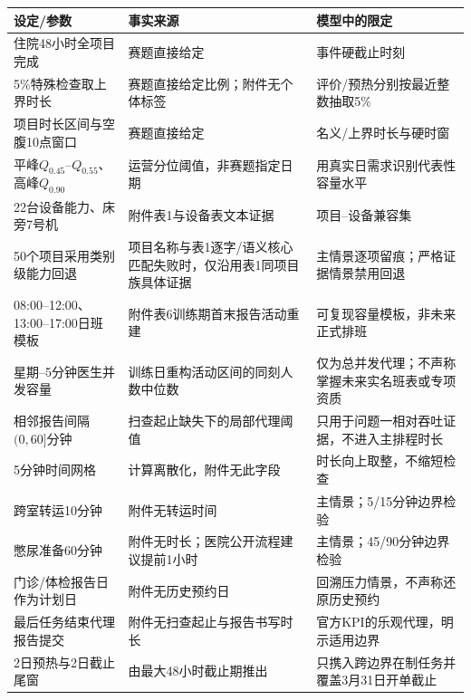 \begin{tabularx}{\textwidth}{p{} p{} X}
\toprule
设定/参数 & 事实来源 & 模型中的限定 \\
\midrule
住院48小时全项目完成 & 赛题直接给定 & 事件硬截止时刻 \\
5\%特殊检查取上界时长 & 赛题直接给定比例；附件无个体标签 & 评价/预热分别按最近整数抽取5\% \\
项目时长区间与空腹10点窗口 & 赛题直接给定 & 名义/上界时长与硬时窗 \\
平峰$Q_{0.45}$--$Q_{0.55}$、高峰$Q_{0.90}$ & 运营分位阈值，非赛题指定日期 & 用真实日需求识别代表性容量水平 \\
22台设备能力、床旁7号机 & 附件表1与设备表文本证据 & 项目--设备兼容集 \\
50个项目采用类别级能力回退 & 项目名称与表1逐字/语义核心匹配失败时，仅沿用表1同项目族具体证据 & 主情景逐项留痕；严格证据情景禁用回退 \\
08:00--12:00、13:00--17:00日班模板 & 附件表6训练期首末报告活动重建 & 可复现容量模板，非未来正式排班 \\
星期--5分钟医生并发容量 & 训练日重构活动区间的同刻人数中位数 & 仅为总并发代理；不声称掌握未来实名班表或专项资质 \\
相邻报告间隔$(0,60]$分钟 & 扫查起止缺失下的局部代理阈值 & 只用于问题一相对吞吐证据，不进入主排程时长 \\
5分钟时间网格 & 计算离散化，附件无此字段 & 时长向上取整，不缩短检查 \\
跨室转运10分钟 & 附件无转运时间 & 主情景；5/15分钟边界检验 \\
憋尿准备60分钟 & 附件无时长；医院公开流程建议提前1小时\cite{hrhospital2025} & 主情景；45/90分钟边界检验 \\
门诊/体检报告日作为计划日 & 附件无历史预约日 & 回溯压力情景，不声称还原历史预约 \\
最后任务结束代理报告提交 & 附件无扫查起止与报告书写时长 & 官方KPI的乐观代理，明示适用边界 \\
2日预热与2日截止尾窗 & 由最大48小时截止期推出 & 只携入跨边界在制任务并覆盖3月31日开单截止 \\
\bottomrule
\end{tabularx}
